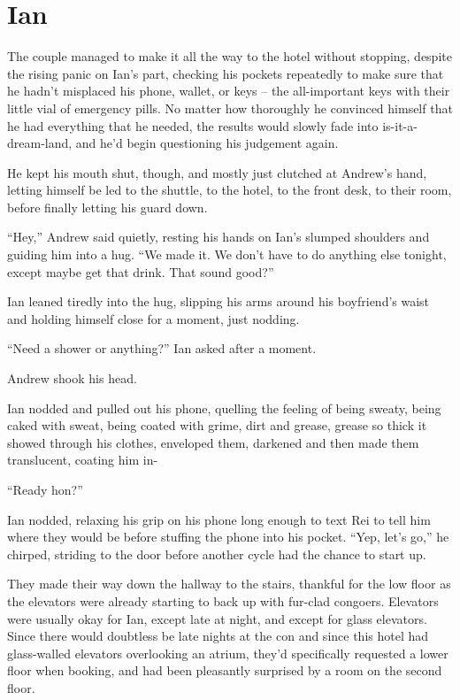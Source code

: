 \chapter{Ian}

The couple managed to make it all the way to the hotel without stopping, despite the rising panic on Ian's part, checking his pockets repeatedly to make sure that he hadn't misplaced his phone, wallet, or keys -- the all-important keys with their little vial of emergency pills. No matter how thoroughly he convinced himself that he had everything that he needed, the results would slowly fade into is-it-a-dream-land, and he'd begin questioning his judgement again.

He kept his mouth shut, though, and mostly just clutched at Andrew's hand, letting himself be led to the shuttle, to the hotel, to the front desk, to their room, before finally letting his guard down.

``Hey,'' Andrew said quietly, resting his hands on Ian's slumped shoulders and guiding him into a hug. ``We made it. We don't have to do anything else tonight, except maybe get that drink. That sound good?''

Ian leaned tiredly into the hug, slipping his arms around his boyfriend's waist and holding himself close for a moment, just nodding.

``Need a shower or anything?'' Ian asked after a moment.

Andrew shook his head.

Ian nodded and pulled out his phone, quelling the feeling of being sweaty, being caked with sweat, being coated with grime, dirt and grease, grease so thick it showed through his clothes, enveloped them, darkened and then made them translucent, coating him in-

``Ready hon?''

Ian nodded, relaxing his grip on his phone long enough to text Rei to tell him where they would be before stuffing the phone into his pocket. ``Yep, let's go,'' he chirped, striding to the door before another cycle had the chance to start up.

They made their way down the hallway to the stairs, thankful for the low floor as the elevators were already starting to back up with fur-clad congoers. Elevators were usually okay for Ian, except late at night, and except for glass elevators. Since there would doubtless be late nights at the con and since this hotel had glass-walled elevators overlooking an atrium, they'd specifically requested a lower floor when booking, and had been pleasantly surprised by a room on the second floor.

